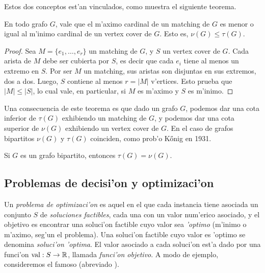 Estos dos conceptos est'an vinculados, como muestra el siguiente teorema.

\begin{theorem}
\label{th:nu_tau}
En todo grafo $G$, vale que el m'aximo cardinal de un matching de $G$ es menor o igual al m'inimo cardinal de un vertex cover de $G$. Esto es, $\nu(G) \leq \tau(G)$.

\begin{proof}
Sea $M = \{e_1, \dots, e_r\}$ un matching de $G$, y $S$ un vertex cover de $G$. Cada arista de $M$ debe ser cubierta por $S$, es decir que cada $e_i$ tiene al menos un extremo en $S$. Por ser $M$ un matching, sus aristas son disjuntas en sus extremos, dos a dos. Luego, $S$ contiene al menos $r = |M|$ v'ertices. Esto prueba que $|M| \leq |S|$, lo cual vale, en particular, si $M$ es m'aximo y $S$ es m'inimo.
\end{proof}
\end{theorem}
 
Una consecuencia de este teorema es que dado un grafo $G$, podemos dar una cota inferior de $\tau(G)$ exhibiendo un matching de $G$, y podemos dar una cota superior de $\nu(G)$ exhibiendo un vertex cover de $G$. En el caso de grafos bipartitos $\nu(G)$ y $\tau(G)$ coinciden, como prob'o K\H{o}nig en 1931.

\begin{theorem}[K\H{o}nig]
Si $G$ es un grafo bipartito, entonces $\tau(G) = \nu(G)$.
\end{theorem}

\subsection{Problemas de decisi'on y optimizaci'on}

Un \textit{problema de optimizaci'on} es aquel en el que cada instancia tiene asociada un conjunto $S$ de \textit{soluciones factibles}, cada una con un valor num'erico asociado, y el objetivo es encontrar una soluci'on factible cuyo valor sea \textit{'optimo} (m'inimo o m'aximo, seg'un el problema). Una soluci'on factible cuyo valor es 'optimo se denomina \textit{soluci'on 'optima}. El valor asociado a cada soluci'on est'a dado por una funci'on $\textnormal{val}: S \to \mathbb{R}$, llamada \textit{funci'on objetivo}. A modo de ejemplo, consideremos el famoso  (abreviado ).


